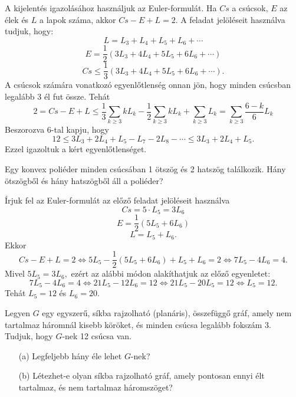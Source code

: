 \begin{solution}
	A kijelentés igazolásához használjuk az Euler-formulát. Ha $Cs$ a
	csúcsok, $E$ az élek és $L$ a lapok száma, akkor $Cs-E+L=2$. A
	feladat jelöléseit használva tudjuk, hogy: 
	\[
	L=L_{3}+L_{4}+L_{5}+L_{6}+\cdots
	\]
	\[
	E=\frac{1}{2}(3L_{3}+4L_{4}+5L_{5}+6L_{6}+\cdots)
	\]
	\[
	Cs\leq\frac{1}{3}(3L_{3}+4L_{4}+5L_{5}+6L_{6}+\cdots).
	\]
	A csúcsok számára vonatkozó egyenlőtlenség onnan jön, hogy minden
	csúcsban legalább 3 él fut össze. Tehát 
	\[
	2=Cs-E+L\leq\frac{1}{3}\sum_{k\geq3}kL_{k}-\frac{1}{2}\sum_{k\geq3}kL_{k}+\sum_{k\geq3}L_{k}=\sum_{k\geq3}\frac{6-k}{6}L_{k}
	\]
	Beszorozva 6-tal kapju, hogy 
	\[
	12\leq3L_{3}+2L_{4}+L_{5}-L_{7}-2L_{8}-\cdots\leq3L_{3}+2L_{4}+L_{5}.
	\]
	Ezzel igazoltuk a kért egyenlőtlenséget. 
\end{solution}
\begin{extraproblem}
	Egy konvex poliéder minden csúcsában 1 ötszög és 2 hatszög találkozik.
	Hány ötszögből és hány hatszögből áll a poliéder? 
\end{extraproblem}

\begin{solution}
	Írjuk fel az Euler-formulát az előző feladat jelöléseit használva
	\[
	Cs=5\cdot L_{5}=3L_{6}
	\]
	\[
	E=\frac{1}{2}(5L_{5}+6L_{6})
	\]
	\[
	L=L_{5}+L_{6}.
	\]
	Ekkor 
	\[
	Cs-E+L=2\iff5L_{5}-\frac{1}{2}(5L_{5}+6L_{6})+L_{5}+L_{6}=2\iff7L_{5}-4L_{6}=4.
	\]
	Mivel $5L_{5}=3L_{6},$ ezért az alábbi módon alakíthatjuk az előző
	egyenletet: 
	\[
	7L_{5}-4L_{6}=4\iff21L_{5}-12L_{6}=12\iff21L_{5}-20L_{5}=12\iff L_{5}=12.
	\]
	Tehát $L_{5}=12$ és $L_{6}=20$. 
\end{solution}
\begin{extraproblem}
	Legyen $G$ egy egyszerű, síkba rajzolható (planáris), összefüggő
	gráf, amely nem tartalmaz háromnál kisebb köröket, és minden csúcsa
	legalább fokszám 3. Tudjuk, hogy $G$-nek 12 csúcsa van.
	\begin{enumerate}
		\item[(a)] Legfeljebb hány éle lehet $G$-nek? 
		\item[(b)] Létezhet-e olyan síkba rajzolható gráf, amely pontosan ennyi élt
		tartalmaz, és nem tartalmaz háromszöget? 
	\end{enumerate}
\end{extraproblem}


